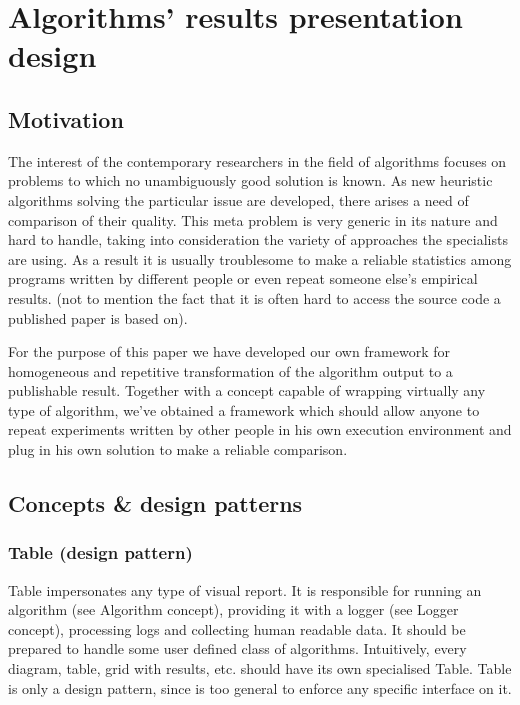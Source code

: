 \chapter{Algorithms' results presentation design}
\section{Motivation}

The interest of the contemporary researchers in the field of algorithms 
focuses on problems to which no unambiguously good solution is known. As new heuristic algorithms solving the
particular issue are developed, there arises a need of comparison of their
quality. This meta problem is very generic in its nature and hard to handle,
taking into consideration the variety of approaches the specialists are using.
As a result it is usually troublesome to make a reliable statistics among programs
written by different people or even repeat someone else's empirical results. (not to mention
the fact that it is often hard to access the source code a published paper is
based on).

For the purpose of this paper we have developed our own framework
for homogeneous and repetitive transformation of the algorithm output to a
publishable result. Together with a concept capable of wrapping virtually any
type of algorithm, we've obtained a framework which should allow anyone to
repeat experiments written by other people in his own execution environment
and plug in his own solution to make a reliable comparison.

\section{Concepts \& design patterns}

\subsection{Table (design pattern)}

Table impersonates any type of visual report.
It is responsible for running an algorithm (see Algorithm concept), providing
it with a logger (see Logger concept), processing logs and collecting human
readable data. It should be prepared to handle some user defined class of
algorithms. Intuitively, every diagram, table, grid with results, etc. should
have its own specialised Table. Table is only a design pattern, since is too
general to enforce any specific interface on it.

